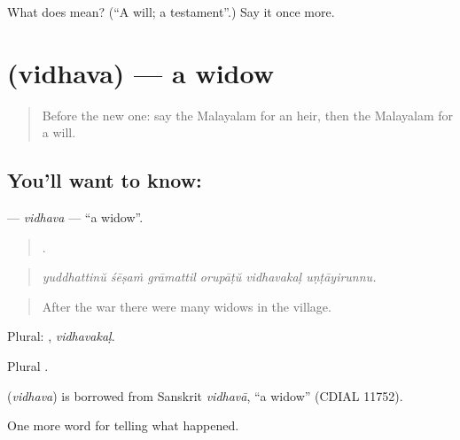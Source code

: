 \begin{tcolorbox}[breakable,colback=teal!4,colframe=teal!35!black,title={Before you move on}]
What does  mean? (\textquotedblleft{}A will; a testament\textquotedblright{}.) Say it once more.
\end{tcolorbox}
\section[\texorpdfstring{\ml{വിധവ} (vidhava)}{വിധവ (vidhava)}]{ (vidhava) — a widow}

\label{lesson:ML-C394-vidhava}



\begin{quote}
Before the new one: say the Malayalam for an heir, then the Malayalam for a will.
\end{quote}

\subsection*{You'll want to know: }
\textbf{} — \emph{vidhava} — \textquotedblleft{}a widow\textquotedblright{}.

\begin{quote}
     .
\end{quote}

\begin{quote}
\emph{yuddhattinŭ śēṣaṁ grāmattil orupāṭŭ vidhavakaḷ uṇṭāyirunnu.}
\end{quote}

\begin{quote}
After the war there were many widows in the village.
\end{quote}

Plural: , \emph{vidhavakaḷ}.

Plural .

\begin{cousinweb}
\textbf{} (\emph{vidhava}) is borrowed from Sanskrit \emph{vidhavā}, \textquotedblleft{}a widow\textquotedblright{} (CDIAL 11752).
\end{cousinweb}

\begin{grammarlens}[title={What you've built}]
One more word for telling what happened.
\end{grammarlens}

